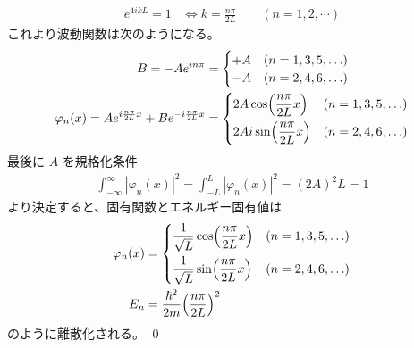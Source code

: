 \documentclass[uplatex,dvipdfmx,a4paper,11pt]{jlreq}
\makeatletter
\theoremstyle{definition}
\renewenvironment{proof}[1][\proofname]{\par
  \normalfont
  \topsep6\p@\@plus6\p@ \trivlist
  \item[\hskip\labelsep{\bfseries #1}\@addpunct{\bfseries}]\ignorespaces\quad\par
}{%
  \qed\endtrivlist\@endpefalse
}
\renewcommand\proofname{証明}
\makeatother
\begin{document}
\begin{proof}
\begin{align}
    e^{4ikL} = 1 & \iff k = \frac{n\pi}{2L} \qquad (n = 1,2,\cdots)
  \end{align}
  これより波動関数は次のようになる。
  \begin{align}
    B = - Ae^{in\pi}                                                & = \begin{cases}
                                                                          +A & (n = 1,3,5,\ldots) \\
                                                                          -A & (n = 2,4,6,\ldots)
                                                                        \end{cases}                        \\
    \varphi_n(x) = Ae^{i\frac{n\pi}{2L}x} + Be^{-i\frac{n\pi}{2L}x} & = \begin{dcases}
                                                                          2A\cos(\frac{n\pi}{2L}x)  & (n = 1,3,5,\ldots) \\
                                                                          2Ai\sin(\frac{n\pi}{2L}x) & (n = 2,4,6,\ldots)
                                                                        \end{dcases}
  \end{align}
  最後に $A$ を規格化条件
  \begin{align}
    \int_{-\infty}^\infty |\varphi_n(x)|^2 = \int_{-L}^L |\varphi_n(x)|^2 = (2A)^2L = 1
  \end{align}
  より決定すると、固有関数とエネルギー固有値は
  \begin{align}
    \varphi_n(x) & = \begin{dcases}
                       \frac{1}{\sqrt{L}}\cos(\frac{n\pi}{2L}x) & (n = 1,3,5,\ldots) \\
                       \frac{1}{\sqrt{L}}\sin(\frac{n\pi}{2L}x) & (n = 2,4,6,\ldots)
                     \end{dcases} \\
    E_n          & = \frac{\hbar^2}{2m}\qty(\frac{n\pi}{2L})^2
  \end{align}
  のように離散化される。
\end{proof}
\end{document}

